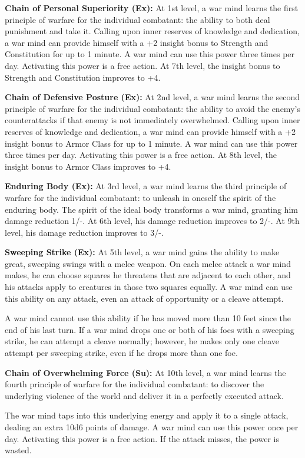 \documentclass{article}
\begin{document}
\textbf{Chain of Personal Superiority (Ex):} At 1st level, a war mind learns the 
first principle of warfare for the individual combatant: the ability to both deal 
punishment and take it. Calling upon inner reserves of knowledge and dedication, 
a war mind can provide himself with a +2 insight bonus to Strength and Constitution 
for up to 1 minute. A war mind can use this power three times per day. Activating 
this power is a free action. At 7th level, the insight bonus to Strength and Constitution 
improves to +4.

\textbf{Chain of Defensive Posture (Ex):} At 2nd level, a war mind learns the second 
principle of warfare for the individual combatant: the ability to avoid the enemy's 
counterattacks if that enemy is not immediately overwhelmed. Calling upon inner 
reserves of knowledge and dedication, a war mind can provide himself with a +2 
insight bonus to Armor Class for up to 1 minute. A war mind can use this power 
three times per day. Activating this power is a free action. At 8th level, the 
insight bonus to Armor Class improves to +4.

\textbf{Enduring Body (Ex):} At 3rd level, a war mind learns the third principle 
of warfare for the individual combatant: to unleash in oneself the spirit of the 
enduring body. The spirit of the ideal body transforms a war mind, granting him 
damage reduction 1/-. At 6th level, his damage reduction improves to 2/-. At 9th 
level, his damage reduction improves to 3/-.

\textbf{Sweeping Strike (Ex):} At 5th level, a war mind gains the ability to make 
great, sweeping swings with a melee weapon. On each melee attack a war mind makes, 
he can choose squares he threatens that are adjacent to each other, and his attacks 
apply to creatures in those two squares equally. A war mind can use this ability 
on any attack, even an attack of opportunity or a cleave attempt.

A war mind cannot use this ability if he has moved more than 10 feet since the 
end of his last turn. If a war mind drops one or both of his foes with a sweeping 
strike, he can attempt a cleave normally; however, he makes only one cleave attempt 
per sweeping strike, even if he drops more than one foe.

\textbf{Chain of Overwhelming Force (Su):} At 10th level, a war mind learns the 
fourth principle of warfare for the individual combatant: to discover the underlying 
violence of the world and deliver it in a perfectly executed attack.

The war mind taps into this underlying energy and apply it to a single attack, 
dealing an extra 10d6 points of damage. A war mind can use this power once per 
day. Activating this power is a free action. If the attack misses, the power is 
wasted.

\newpage
\end{document}
